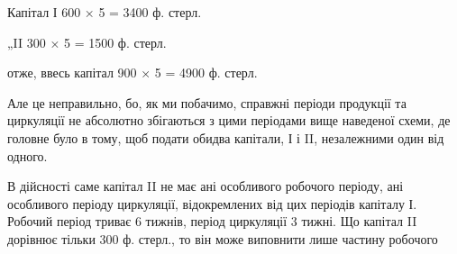 Капітал І 600 × 5 = 3400 ф. стерл.

„II 300 × 5 = 1500 ф. стерл.

отже, ввесь капітал    900 × 5 = 4900 ф. стерл.

Але це неправильно, бо, як ми побачимо, справжні періоди продукції
та циркуляції не абсолютно збігаються з цими періодами вище наведеної
схеми, де головне було в тому, щоб подати обидва капітали, І і II, незалежними
один від одного.

В дійсності саме капітал II не має ані особливого робочого періоду, ані особливого
періоду циркуляції, відокремлених від цих періодів капіталу І. Робочий
період триває 6 тижнів, період циркуляції 3 тижні. Що капітал II дорівнює
тільки 300 ф. стерл., то він може виповнити лише частину робочого
\parbreak{}  %
